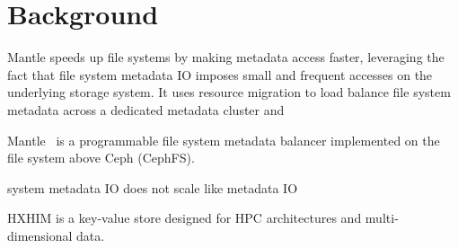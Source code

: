\section{Background}

Mantle speeds up file systems by making metadata access faster, leveraging the
fact that file system metadata IO imposes small and frequent accesses on the
underlying storage system. It uses resource migration to load balance file
system metadata across a dedicated metadata cluster and 


Mantle~\cite{sevilla:sc15-mantle} is a programmable file system metadata
balancer implemented on the file system above Ceph (CephFS). 

system metadata IO does not scale like metadata IO~\cite{roselli:atec2000-FS-workloads}

HXHIM is a key-value store designed for HPC architectures and multi-dimensional
data. 


